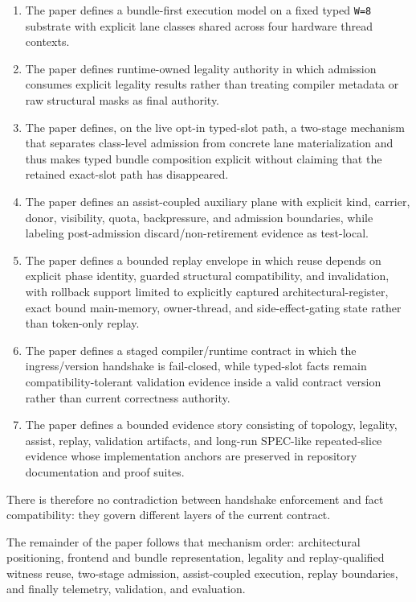 \documentclass[twocolumn]{article}
\begin{document}
\begin{enumerate}
\item The paper defines a bundle-first execution model on a fixed typed \texttt{W=8} substrate with explicit lane classes shared across four hardware thread contexts.
\item The paper defines runtime-owned legality authority in which admission consumes explicit legality results rather than treating compiler metadata or raw structural masks as final authority.
\item The paper defines, on the live opt-in typed-slot path, a two-stage mechanism that separates class-level admission from concrete lane materialization and thus makes typed bundle composition explicit without claiming that the retained exact-slot path has disappeared.
\item The paper defines an assist-coupled auxiliary plane with explicit kind, carrier, donor, visibility, quota, backpressure, and admission boundaries, while labeling post-admission discard/non-retirement evidence as test-local.
\item The paper defines a bounded replay envelope in which reuse depends on explicit phase identity, guarded structural compatibility, and invalidation, with rollback support limited to explicitly captured architectural-register, exact bound main-memory, owner-thread, and side-effect-gating state rather than token-only replay.
\item The paper defines a staged compiler/runtime contract in which the ingress/version handshake is fail-closed, while typed-slot facts remain compatibility-tolerant validation evidence inside a valid contract version rather than current correctness authority.
\item The paper defines a bounded evidence story consisting of topology, legality, assist, replay, validation artifacts, and long-run SPEC-like repeated-slice evidence whose implementation anchors are preserved in repository documentation and proof suites.
\end{enumerate}

There is therefore no contradiction between handshake enforcement and fact compatibility: they govern different layers of the current contract.

The remainder of the paper follows that mechanism order: architectural positioning, frontend and bundle representation, legality and replay-qualified witness reuse, two-stage admission, assist-coupled execution, replay boundaries, and finally telemetry, validation, and evaluation.
\end{document}
